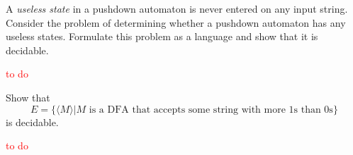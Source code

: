 \begin{exercise}{4.24}
  A \textit{useless state} in a pushdown automaton is never entered on any input string. Consider the problem of determining whether a pushdown automaton has any useless states. Formulate this problem as a language and show that it is decidable.
\end{exercise}

\textcolor{red}{to do}

\setcounter{exercise}{26}

\begin{exercise}{4.27}
  Show that
  \[
    E=\{\langle M\rangle|M\text{ is a DFA that accepts some string with more 1s than 0s}\}
  \] is decidable.
\end{exercise}

\textcolor{red}{to do}
